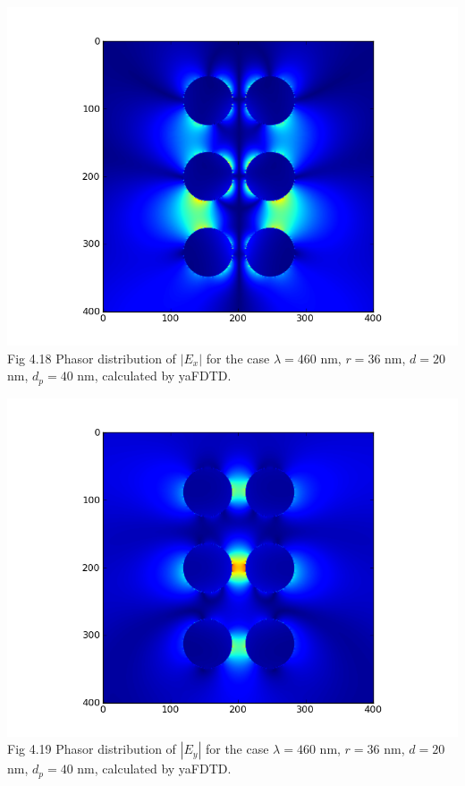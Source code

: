 \documentclass[openany]{book}
\begin{document}
\begin{center}
\includegraphics[scale=0.8]{images/ex-d40.png}\\
Fig 4.18
Phasor distribution of $|E_x|$ for the case $\lambda = 460$ nm, $r = 36$ nm, $d = 20$ nm, $d_p = 40$ nm, calculated by yaFDTD.
\end{center}

\begin{center}
\includegraphics[scale=0.8]{images/ey-d40.png}\\
Fig 4.19
Phasor distribution of $|E_y|$ for the case $\lambda = 460$ nm, $r = 36$ nm, $d = 20$ nm, $d_p = 40$ nm, calculated by yaFDTD.
\end{center}
\end{document}
